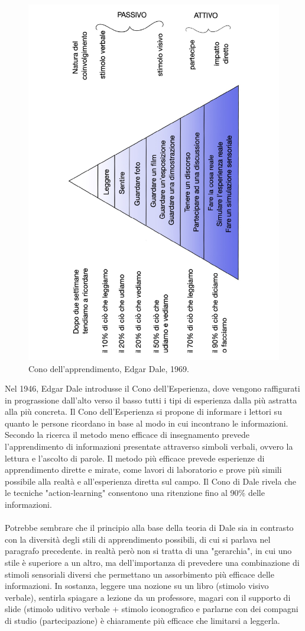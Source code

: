 \begin{figure}[h!]
  \centerline{\includegraphics[height = 12 cm, width= 8 cm, angle=270]{figures/cono.pdf}}
  \caption{Cono dell'apprendimento, Edgar Dale, 1969.}
\end{figure}
Nel 1946, Edgar Dale introdusse il Cono dell'Esperienza, dove vengono raffigurati in prograssione dall'alto verso il basso tutti i tipi di esperienza dalla più astratta alla più concreta. Il Cono dell'Esperienza si propone di informare i lettori su quanto le persone ricordano in base al modo in cui incontrano le informazioni. Secondo la ricerca il metodo meno efficace di insegnamento prevede l'apprendimento di informazioni presentate attraverso simboli verbali, ovvero la lettura e l'ascolto di parole. Il metodo più efficace prevede esperienze di apprendimento dirette e mirate, come lavori di laboratorio e prove più simili possibile alla realtà e all'esperienza diretta sul campo. Il Cono di Dale rivela che le tecniche "action-learning" consentono una ritenzione fino al 90\% delle informazioni.\\
\\
Potrebbe sembrare che il principio alla base della teoria di Dale sia in contrasto con la diversità degli stili di apprendimento possibili, di cui si parlava nel paragrafo precedente. in realtà però non si tratta di una "gerarchia", in cui uno stile è superiore a un altro, ma dell'importanza di prevedere una combinazione di stimoli sensoriali diversi che permettano un assorbimento più efficace delle informazioni. In sostanza, leggere una nozione su un libro (stimolo visivo verbale), sentirla spiagare a lezione da un professore, magari con il supporto di slide (stimolo uditivo verbale + stimolo iconografico e parlarne con dei compagni di studio (partecipazione) è chiaramente più efficace che limitarsi a leggerla.
